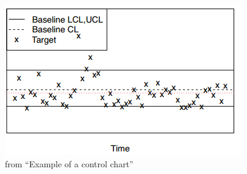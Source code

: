 \begin{figure}[h]
\begin{center}
  \includegraphics[scale=0.7]{Figures/controlchart.png}
\end{center}
  \caption{from ``Example of a control chart''\cite{nguyen2012using}}

\end{figure}




